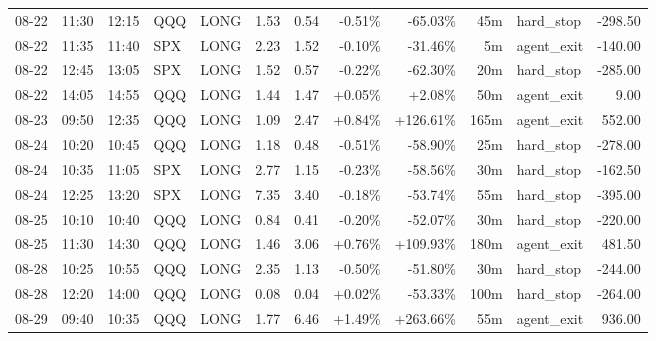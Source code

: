 \documentclass[11pt,a4paper,twoside]{article}
\begin{document}
\begin{center}
\begin{longtable}{>{\color{txtmain}}l l l l l r r r r r >{\color{txtmain}}l r}
08-22 & 11:30 & 12:15 & QQQ & LONG & 1.53 & 0.54 & \textcolor{lossred}{-0.51\%} & \textcolor{lossred}{-65.03\%} & 45m & hard\_stop & \textcolor{lossred}{-298.50} \\
08-22 & 11:35 & 11:40 & SPX & LONG & 2.23 & 1.52 & \textcolor{lossred}{-0.10\%} & \textcolor{lossred}{-31.46\%} & 5m & agent\_exit & \textcolor{lossred}{-140.00} \\
08-22 & 12:45 & 13:05 & SPX & LONG & 1.52 & 0.57 & \textcolor{lossred}{-0.22\%} & \textcolor{lossred}{-62.30\%} & 20m & hard\_stop & \textcolor{lossred}{-285.00} \\
08-22 & 14:05 & 14:55 & QQQ & LONG & 1.44 & 1.47 & \textcolor{wingreen}{+0.05\%} & \textcolor{wingreen}{+2.08\%} & 50m & agent\_exit & \textcolor{wingreen}{9.00} \\
08-23 & 09:50 & 12:35 & QQQ & LONG & 1.09 & 2.47 & \textcolor{wingreen}{+0.84\%} & \textcolor{wingreen}{+126.61\%} & 165m & agent\_exit & \textcolor{wingreen}{552.00} \\
08-24 & 10:20 & 10:45 & QQQ & LONG & 1.18 & 0.48 & \textcolor{lossred}{-0.51\%} & \textcolor{lossred}{-58.90\%} & 25m & hard\_stop & \textcolor{lossred}{-278.00} \\
08-24 & 10:35 & 11:05 & SPX & LONG & 2.77 & 1.15 & \textcolor{lossred}{-0.23\%} & \textcolor{lossred}{-58.56\%} & 30m & hard\_stop & \textcolor{lossred}{-162.50} \\
08-24 & 12:25 & 13:20 & SPX & LONG & 7.35 & 3.40 & \textcolor{lossred}{-0.18\%} & \textcolor{lossred}{-53.74\%} & 55m & hard\_stop & \textcolor{lossred}{-395.00} \\
08-25 & 10:10 & 10:40 & QQQ & LONG & 0.84 & 0.41 & \textcolor{lossred}{-0.20\%} & \textcolor{lossred}{-52.07\%} & 30m & hard\_stop & \textcolor{lossred}{-220.00} \\
08-25 & 11:30 & 14:30 & QQQ & LONG & 1.46 & 3.06 & \textcolor{wingreen}{+0.76\%} & \textcolor{wingreen}{+109.93\%} & 180m & agent\_exit & \textcolor{wingreen}{481.50} \\
08-28 & 10:25 & 10:55 & QQQ & LONG & 2.35 & 1.13 & \textcolor{lossred}{-0.50\%} & \textcolor{lossred}{-51.80\%} & 30m & hard\_stop & \textcolor{lossred}{-244.00} \\
08-28 & 12:20 & 14:00 & QQQ & LONG & 0.08 & 0.04 & \textcolor{wingreen}{+0.02\%} & \textcolor{lossred}{-53.33\%} & 100m & hard\_stop & \textcolor{lossred}{-264.00} \\
08-29 & 09:40 & 10:35 & QQQ & LONG & 1.77 & 6.46 & \textcolor{wingreen}{+1.49\%} & \textcolor{wingreen}{+263.66\%} & 55m & agent\_exit & \textcolor{wingreen}{936.00} \\

\end{longtable}
\end{center}
\end{document}
